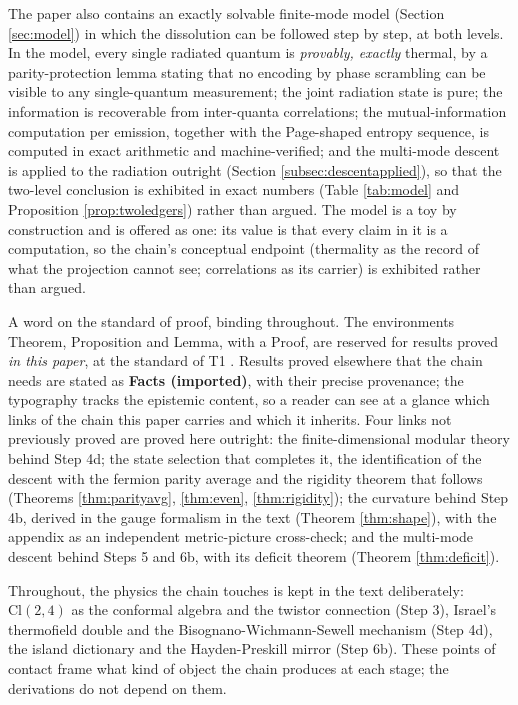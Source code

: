 \documentclass[11pt]{article}
\theoremstyle{definition}
\newcommand{\Cl}{\mathrm{Cl}}
\begin{document}
The paper also contains an exactly solvable finite-mode model (Section \ref{sec:model}) in which the dissolution can be followed step by step, at both levels. In the model, every single radiated quantum is \emph{provably, exactly} thermal, by a parity-protection lemma stating that no encoding by phase scrambling can be visible to any single-quantum measurement; the joint radiation state is pure; the information is recoverable from inter-quanta correlations; the mutual-information computation per emission, together with the Page-shaped entropy sequence, is computed in exact arithmetic and machine-verified; and the multi-mode descent is applied to the radiation outright (Section \ref{subsec:descentapplied}), so that the two-level conclusion is exhibited in exact numbers (Table \ref{tab:model} and Proposition \ref{prop:twoledgers}) rather than argued. The model is a toy by construction and is offered as one: its value is that every claim in it is a computation, so the chain's conceptual endpoint (thermality as the record of what the projection cannot see; correlations as its carrier) is exhibited rather than argued.

A word on the standard of proof, binding throughout. The environments Theorem, Proposition and Lemma, with a Proof, are reserved for results proved \emph{in this paper}, at the standard of T1 \cite{ButlerT1}. Results proved elsewhere that the chain needs are stated as \textbf{Facts (imported)}, with their precise provenance; the typography tracks the epistemic content, so a reader can see at a glance which links of the chain this paper carries and which it inherits. Four links not previously proved are proved here outright: the finite-dimensional modular theory behind Step 4d; the state selection that completes it, the identification of the descent with the fermion parity average and the rigidity theorem that follows (Theorems \ref{thm:parityavg}, \ref{thm:even}, \ref{thm:rigidity}); the curvature behind Step 4b, derived in the gauge formalism in the text (Theorem \ref{thm:shape}), with the appendix as an independent metric-picture cross-check; and the multi-mode descent behind Steps 5 and 6b, with its deficit theorem (Theorem \ref{thm:deficit}).

Throughout, the physics the chain touches is kept in the text deliberately: $\Cl(2,4)$ as the conformal algebra and the twistor connection (Step 3), Israel's thermofield double and the Bisognano-Wichmann-Sewell mechanism (Step 4d), the island dictionary and the Hayden-Preskill mirror (Step 6b). These points of contact frame what kind of object the chain produces at each stage; the derivations do not depend on them.
\end{document}

